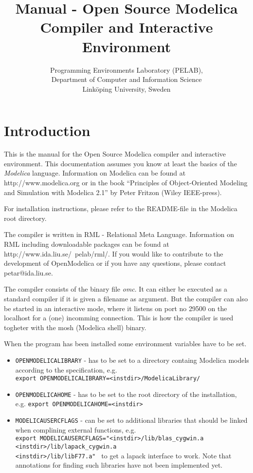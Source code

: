 \documentclass{report}
\title{Manual - Open Source Modelica Compiler and Interactive Environment}
\author{Programming Environments Laboratory (PELAB), \\ Department of Computer and Information Science \\ Link\"{o}ping University, Sweden}
\begin{document}
\maketitle
\chapter{Introduction}
This is the manual for the Open Source Modelica compiler and
interactive environment. This documentation assumes you know at least
the basics of the \emph{Modelica} language. Information on Modelica
can be found at http://www.modelica.org or in the book
``Principles of Object-Oriented Modeling and Simulation with Modelica
2.1'' by Peter Fritzon (Wiley IEEE-press).

For installation instructions, please refer to the README-file in the
Modelica root directory.

The compiler is written in RML - Relational Meta Language. Information
on RML including downloadable packages can be found at
http://www.ida.liu.se/~pelab/rml/. If you would like to
contribute to the development of OpenModelica or if you have any
questions, please contact petar@ida.liu.se.

The compiler consists of the binary file \emph{omc}. It can either
be executed as a standard compiler if it is given a filename as
argument. But the compiler can also be started in an interactive mode,
where it listens on port no 29500 on the localhost for a (one)
incomming connection. This is how the compiler is used togheter with
the mosh (Modelica shell) binary.

When the program has been installed some environment variables have to
be set.
\begin{itemize}
\item{{\tt OPENMODELICALIBRARY}} - has to be set to a directory containg Modelica
models according to the specification, e.g.  \\ {\tt export
OPENMODELICALIBRARY=<instdir>/ModelicaLibrary/ }
\item{{\tt OPENMODELICAHOME}} - has to be set to the root directory of the
installation, e.g. {\tt export
OPENMODELICAHOME=<instdir> } 
\item{{\tt MODELICAUSERCFLAGS}} - can be set to additional libraries
that should be linked when complining external functions, e.g. \\
{\tt export MODELICAUSERCFLAGS="<instdir>/lib/blas\_cygwin.a \\
<instdir>/lib/lapack\_cygwin.a  \\
<instdir>/lib/libF77.a" } to
get a lapack interface to work. Note that annotations for finding such
libraries have not been implemented yet.
\end{itemize}
\end{document}
